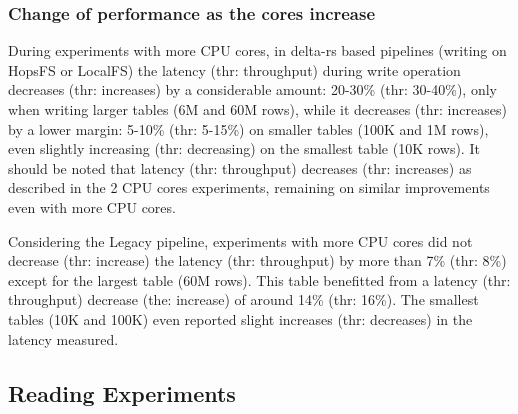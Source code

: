 \subsubsection*{Change of performance as the  cores increase}

During experiments with more \gls{CPU} cores, in delta-rs based pipelines (writing on \gls{HopsFS} or \gls{LocalFS}) the latency (thr: throughput) during write operation decreases (thr: increases) by a considerable amount: 20-30\% (thr: 30-40\%), only when writing larger tables (6M and 60M rows), while it decreases (thr: increases) by a lower margin: 5-10\% (thr: 5-15\%) on smaller tables (100K and 1M rows), even slightly increasing (thr: decreasing) on the smallest table (10K rows). It should be noted that latency (thr: throughput) decreases (thr: increases) as described in the 2 \gls{CPU} cores experiments, remaining on similar improvements even with more \gls{CPU} cores.

Considering the Legacy pipeline, experiments with more \gls{CPU} cores did not decrease (thr: increase) the latency (thr: throughput) by more than 7\% (thr: 8\%) except for the largest table (60M rows). This table benefitted from a latency (thr: throughput) decrease (the: increase) of around 14\% (thr: 16\%). The smallest tables (10K and 100K) even reported slight increases (thr: decreases) in the latency measured.

\subsection{Reading Experiments}

